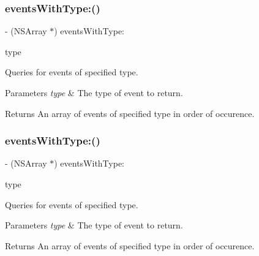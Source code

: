 \subsubsection{\texorpdfstring{events\+With\+Type\+:()}{eventsWithType:()}\hspace{0.1cm}{\footnotesize\ttfamily [2/3]}}
{\footnotesize\ttfamily -\/ (N\+S\+Array $\ast$) events\+With\+Type\+: \begin{DoxyParamCaption}\item[{(P\+O\+P\+Animation\+Event\+Type)}]{type }\end{DoxyParamCaption}}

Queries for events of specified type. 
\begin{DoxyParams}{Parameters}
{\em type} & The type of event to return. \\
\hline
\end{DoxyParams}
\begin{DoxyReturn}{Returns}
An array of events of specified type in order of occurence. 
\end{DoxyReturn}
\mbox{\label{interface_p_o_p_animation_tracer_a6a7fd2d3ca93d8cfeea745e51e2bad04}} 
\subsubsection{\texorpdfstring{events\+With\+Type\+:()}{eventsWithType:()}\hspace{0.1cm}{\footnotesize\ttfamily [3/3]}}
{\footnotesize\ttfamily -\/ (N\+S\+Array $\ast$) events\+With\+Type\+: \begin{DoxyParamCaption}\item[{(P\+O\+P\+Animation\+Event\+Type)}]{type }\end{DoxyParamCaption}}

Queries for events of specified type. 
\begin{DoxyParams}{Parameters}
{\em type} & The type of event to return. \\
\hline
\end{DoxyParams}
\begin{DoxyReturn}{Returns}
An array of events of specified type in order of occurence. 
\end{DoxyReturn}
\mbox{\label{interface_p_o_p_animation_tracer_a172bb65bdc4887fc5bfe4bcd38e5a5e8}} 
